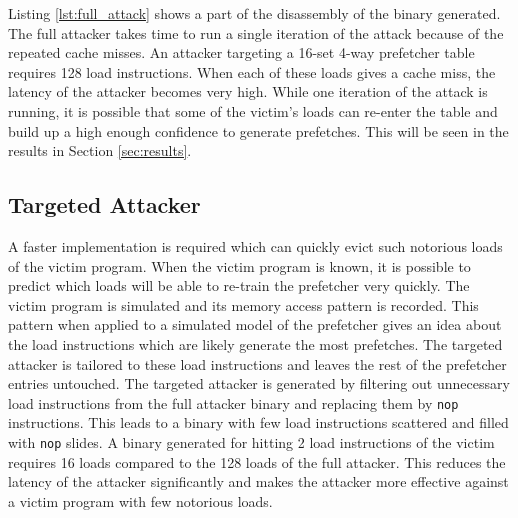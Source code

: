 Listing \ref{lst:full_attack} shows a part of the disassembly of the binary
generated.
The full attacker takes time to run a single iteration of the attack
because of the repeated cache misses.
An attacker targeting a 16-set 4-way prefetcher table requires
128 load instructions. When each of these loads gives a cache miss,
the latency of the attacker becomes very high.
While one iteration of the attack is running, it is possible that
some of the victim's loads can re-enter the table and build up a high enough
confidence to generate prefetches. This will be seen in the results in Section
\ref{sec:results}.

\subsection{Targeted Attacker} \label{sec:identify-loads}

A faster implementation is required which can quickly evict such notorious loads
of the victim program.
When the victim program is known, it is possible to predict which loads will
be able to re-train the prefetcher very quickly. The victim program
is simulated and its memory access pattern is recorded. This pattern when
applied to a simulated model of the prefetcher gives an idea about the
load instructions which are likely generate the most prefetches.
The targeted attacker is tailored to these load instructions and leaves
the rest of the prefetcher entries untouched.
The targeted attacker is generated by filtering out unnecessary load instructions
from the full attacker binary and replacing them by \texttt{nop} instructions.
This leads to a binary with few load instructions scattered and filled with \texttt{nop}
slides.
A binary generated for hitting 2 load instructions of the victim requires
16 loads compared to the 128 loads of the full attacker. This reduces the
latency of the attacker significantly and makes the attacker
more effective against a victim program with few notorious loads.

